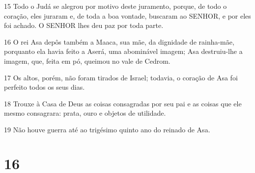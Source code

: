 \par 15 Todo o Judá se alegrou por motivo deste juramento, porque, de todo o coração, eles juraram e, de toda a boa vontade, buscaram ao SENHOR, e por eles foi achado. O SENHOR lhes deu paz por toda parte.
\par 16 O rei Asa depôs também a Maaca, sua mãe, da dignidade de rainha-mãe, porquanto ela havia feito a Aserá, uma abominável imagem; Asa destruiu-lhe a imagem, que, feita em pó, queimou no vale de Cedrom.
\par 17 Os altos, porém, não foram tirados de Israel; todavia, o coração de Asa foi perfeito todos os seus dias.
\par 18 Trouxe à Casa de Deus as coisas consagradas por seu pai e as coisas que ele mesmo consagrara: prata, ouro e objetos de utilidade.
\par 19 Não houve guerra até ao trigésimo quinto ano do reinado de Asa.

\chapter{16}

